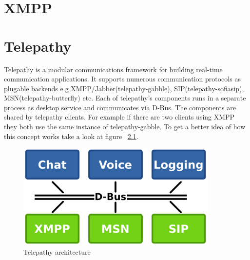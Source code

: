 

\chapter{XMPP}
%


\chapter{Telepathy}
Telepathy\cite{telepathy} is a modular communications framework for building real-time communication applications. It supports numerous communication protocols as plugable backends e.g XMPP/Jabber(telepathy-gabble), SIP(telepathy-sofiasip), MSN(telepathy-butterfly) etc. Each of telepathy's components runs in a separate process as desktop service and communicates via D-Bus. The components are shared by telepathy clients. For example if there are two clients using XMPP they both use the same instance of telepathy-gabble. To get a better idea of how this concept works take a look at figure ~\ref{fig:telepathyArchitecture}.\cite{TPWiki} 

\begin{figure}[ht]
\begin{center}
	\includegraphics[width=10cm]{fig/telepathy-architecture-overview.png}
	\caption{Telepathy architecture\cite{TPWiki}}
	\label{fig:telepathyArchitecture}
\end{center}
\end{figure}


